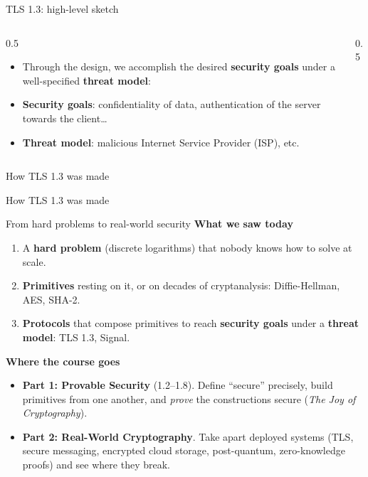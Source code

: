 \ifdefined\PRESENTATION\else\PassOptionsToClass{handout}{beamer}\fi\documentclass[aspectratio=169, lualatex]{beamer}
\begin{document}
\begin{frame}{TLS 1.3: high-level sketch}
	\begin{columns}[c]
		\begin{column}{0.5\textwidth}
			\begin{itemize}[<+->]
				\item Through the design, we accomplish the desired \textbf{security
					      goals} under a well-specified \textbf{threat model}:
				\item \textbf{Security goals}: confidentiality of data, authentication
				      of the server towards the client\ldots
				\item \textbf{Threat model}: malicious Internet Service Provider (ISP),
				      etc.
			\end{itemize}
		\end{column}

		\begin{column}{0.5\textwidth}
		\end{column}
	\end{columns}
\end{frame}

\begin{frame}{How TLS 1.3 was made}
\end{frame}

\begin{frame}{How TLS 1.3 was made}
\end{frame}

\begin{frame}{From hard problems to real-world security}
	\textbf{What we saw today}
	\begin{enumerate}[<+->]
		\item A \textbf{hard problem} (discrete logarithms) that nobody knows how to solve at scale.
		\item \textbf{Primitives} resting on it, or on decades of cryptanalysis: Diffie-Hellman, AES, SHA-2.
		\item \textbf{Protocols} that compose primitives to reach \textbf{security goals} under a \textbf{threat model}: TLS 1.3, Signal.
	\end{enumerate}
	\pause
	\textbf{Where the course goes}
	\begin{itemize}[<+->]
		\item \textbf{Part 1: Provable Security} (1.2--1.8). Define ``secure'' precisely, build primitives from one another, and \emph{prove} the constructions secure (\textit{The Joy of Cryptography}).
		\item \textbf{Part 2: Real-World Cryptography}. Take apart deployed systems (TLS, secure messaging, encrypted cloud storage, post-quantum, zero-knowledge proofs) and see where they break.
	\end{itemize}
\end{frame}
\end{document}
